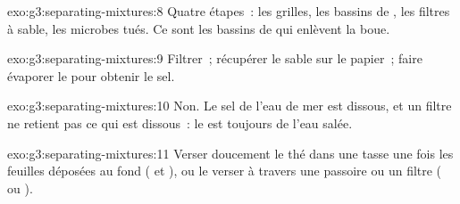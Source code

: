\begin{solution}{exo:g3:separating-mixtures:8}
Quatre étapes~: les grilles, les bassins de , les filtres à
sable, les microbes tués. Ce sont les bassins de  qui
enlèvent la boue.
\end{solution}

\begin{solution}{exo:g3:separating-mixtures:9}
Filtrer~; récupérer le sable sur le papier~; faire évaporer le 
pour obtenir le sel.
\end{solution}

\begin{solution}{exo:g3:separating-mixtures:10}
Non. Le sel de l'eau de mer est dissous, et un filtre ne retient pas ce
qui est dissous~: le  est toujours de l'eau salée.
\end{solution}

\begin{solution}{exo:g3:separating-mixtures:11}
Verser doucement le thé dans une tasse une fois les feuilles déposées
au fond ( et ), ou le verser à travers une
passoire ou un filtre ( ou ).
\end{solution}
